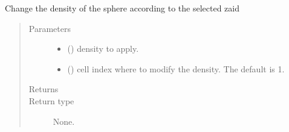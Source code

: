 \documentclass[letterpaper,10pt,english]{sphinxmanual}
\begin{document}
\begin{fulllineitems}
\begin{fulllineitems}
\begin{quote}
\begin{description}
\begin{itemize}
\end{itemize}


\end{description}\end{quote}

\end{fulllineitems}


\begin{fulllineitems}
\label{\detokenize{api/inputgeneration:inputfile.InputFile.change_density}}
\sphinxAtStartPar
Change the density of the sphere according to the selected zaid
\begin{quote}\begin{description}
\item[{Parameters}] \leavevmode\begin{itemize}
\item {} 
\sphinxAtStartPar
{} () \textendash{} density to apply.

\item {} 
\sphinxAtStartPar
{} (\sphinxstyleliteralemphasis{\sphinxupquote{, }}) \textendash{} cell index where to modify the density. The default is 1.

\end{itemize}

\item[{Returns}] \leavevmode
\sphinxAtStartPar


\item[{Return type}] \leavevmode
\sphinxAtStartPar
None.

\end{description}\end{quote}

\end{fulllineitems}



\end{fulllineitems}
\end{document}
